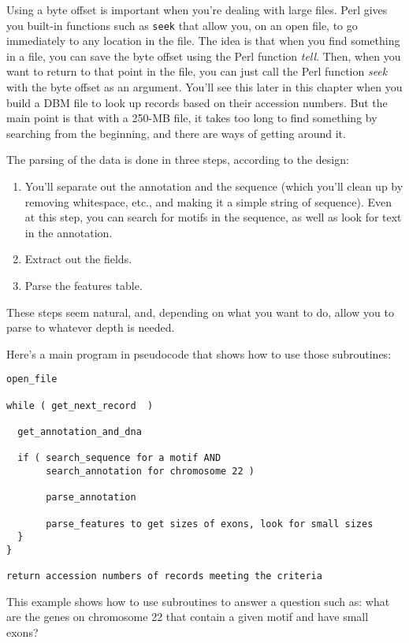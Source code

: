 Using a byte offset is important when you're dealing with large files. Perl gives you built-in functions such as \verb|seek| that allow you, on an open file, to go immediately to any location in the file. The idea is that when you find something in a file, you can save the byte offset using the Perl function \textit{tell}. Then, when you want to return to that point in the file, you can just call the Perl function \textit{seek} with the byte offset as an argument. You'll see this later in this chapter when you build a DBM file to look up records based on their accession numbers. But the main point is that with a 250-MB file, it takes too long to find something by searching from the beginning, and there are ways of getting around it.

The parsing of the data is done in three steps, according to the design: 

\begin{enumerate}
  \item You'll separate out the annotation and the sequence (which you'll clean up by removing whitespace, etc., and making it a simple string of sequence). Even at this step, you can search for motifs in the sequence, as well as look for text in the annotation.
  \item Extract out the fields.
  \item Parse the features table.
\end{enumerate}

These steps seem natural, and, depending on what you want to do, allow you to parse to whatever depth is needed.

Here's a main program in pseudocode that shows how to use those subroutines:

\begin{lstlisting}
open_file 

while ( get_next_record  )

  get_annotation_and_dna

  if ( search_sequence for a motif AND 
       search_annotation for chromosome 22 )

       parse_annotation

       parse_features to get sizes of exons, look for small sizes
  }
}

return accession numbers of records meeting the criteria
\end{lstlisting}

This example shows how to use subroutines to answer a question such as: what are the genes on chromosome 22 that contain a given motif and have small exons?
  
